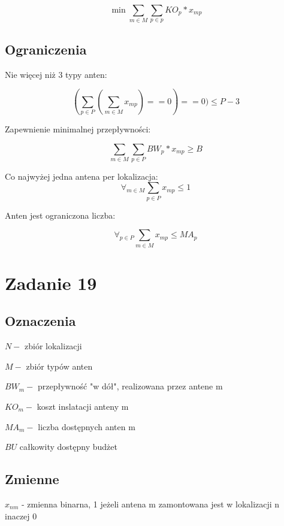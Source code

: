\documentclass{article}
\begin{document}
\begin{equation}
  \min \sum_{m \in M} \sum_{p \in p} KO_p * x_{mp}
\end{equation}

\subsection{Ograniczenia}
Nie więcej niż 3 typy anten:

\begin{equation}
   (\sum_{p \in P}(\sum_{m \in M} x_{mp}) == 0) == 0) \leq P-3
\end{equation}

Zapewnienie minimalnej przepływności:

\begin{equation}
  \sum_{m \in M} \sum_{p \in P} BW_p * x_{mp} \geq B
\end{equation}

Co najwyżej jedna antena per lokalizacja:
\begin{equation}
  \forall_{m \in M} \sum_{p \in P} x_{mp} \leq 1
\end{equation}

Anten jest ograniczona liczba:

\begin{equation}
  \forall_{p \in P} \sum_{m \in M} x_{mp} \leq {MA}_p
\end{equation}


\section{Zadanie 19}

\subsection{Oznaczenia}
$N -$ zbiór lokalizacji

$M -$ zbiór typów anten

$BW_m -$ przepływność "w dół", realizowana przez antene m

$KO_m -$ koszt inslatacji anteny m

$MA_m -$ liczba dostępnych anten m

$BU$ całkowity dostępny budżet

\subsection{Zmienne}
$x_{nm}$ - zmienna binarna, 1 jeżeli antena m zamontowana jest w lokalizacji n inaczej 0
\end{document}
